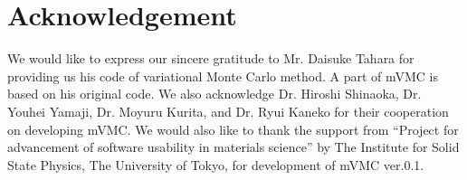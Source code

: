 \chapter{Acknowledgement}
\label{Ch:ack}
We would like to express our sincere gratitude to Mr. Daisuke Tahara
for providing us his code of variational Monte Carlo method.
A part of mVMC is based on his original code.
We also acknowledge Dr. Hiroshi Shinaoka, Dr. Youhei Yamaji, 
Dr. Moyuru Kurita, and Dr. Ryui Kaneko for their cooperation on developing mVMC.
We would also like to thank the support from “Project for advancement of software 
usability in materials science” by The Institute for Solid State Physics, 
The University of Tokyo, for development of mVMC ver.0.1. 
